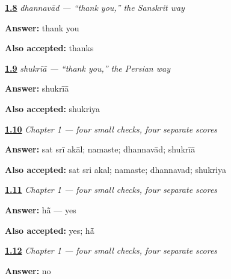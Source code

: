 \noindent\begin{minipage}[t]{\linewidth}
\raggedright
\hyperlink{review-PA-C01-dhanvaad-meaning}{\textbf{1.8}} \emph{\emph{dhannavād} — “thank you,” the Sanskrit way}\par
\small \textbf{Answer:} thank you\par
\footnotesize \textbf{Also accepted:} thanks
\end{minipage}\par\medskip

\noindent\begin{minipage}[t]{\linewidth}
\raggedright
\hyperlink{review-PA-C01-shukriya-source}{\textbf{1.9}} \emph{\emph{shukrīā} — “thank you,” the Persian way}\par
\small \textbf{Answer:} shukrīā\par
\footnotesize \textbf{Also accepted:} shukriya
\end{minipage}\par\medskip

\noindent\begin{minipage}[t]{\linewidth}
\raggedright
\hyperlink{review-PA-C01-practice-greetings}{\textbf{1.10}} \emph{Chapter 1 — four small checks, four separate scores}\par
\small \textbf{Answer:} sat srī akāl; namaste; dhannavād; shukrīā\par
\footnotesize \textbf{Also accepted:} sat sri akal; namaste; dhannavad; shukriya
\end{minipage}\par\medskip

\noindent\begin{minipage}[t]{\linewidth}
\raggedright
\hyperlink{review-PA-C01-practice-reading}{\textbf{1.11}} \emph{Chapter 1 — four small checks, four separate scores}\par
\small \textbf{Answer:} hā̃ — yes\par
\footnotesize \textbf{Also accepted:} yes; hā̃
\end{minipage}\par\medskip

\noindent\begin{minipage}[t]{\linewidth}
\raggedright
\hyperlink{review-PA-C01-practice-listening}{\textbf{1.12}} \emph{Chapter 1 — four small checks, four separate scores}\par
\small \textbf{Answer:} no\par
\end{minipage}\par\medskip

